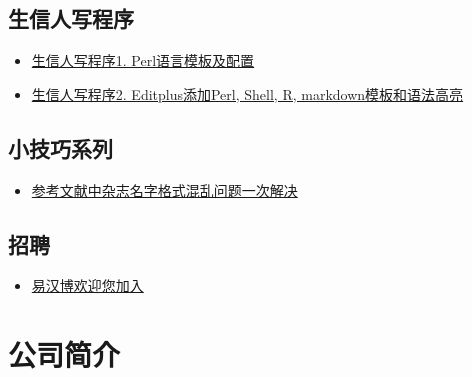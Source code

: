 \documentclass[]{article}
\providecommand{\tightlist}{%
  \setlength{\itemsep}{0pt}\setlength{\parskip}{0pt}}
\numberwithin{figure}{section}
\numberwithin{table}{section}
\theoremstyle{definition}
\theoremstyle{definition}
\theoremstyle{definition}
\theoremstyle{remark}
\begin{document}
\subsection{生信人写程序}

\begin{itemize}
\tightlist
\item
  \href{http://mp.weixin.qq.com/s?__biz=MzI5MTcwNjA4NQ==\&mid=2247483837\&idx=1\&sn=660358a38b7fa6d3de2c95280f7a4535\&chksm=ec0dc437db7a4d21368b312ac43ceae552e1544570639c949e96bf488113a55f67fa2306008e\#rd}{生信人写程序1.
  Perl语言模板及配置}
\item
  \href{http://mp.weixin.qq.com/s?__biz=MzI5MTcwNjA4NQ==\&mid=2247483910\&idx=1\&sn=7813eaa4841d90b0bfc3982bb901de81\&chksm=ec0dc78cdb7a4e9a866f3e0cade3096a13366cac18c873820434f066fdba9bd22a7b5b3d210d\#rd}{生信人写程序2.
  Editplus添加Perl, Shell, R, markdown模板和语法高亮}
\end{itemize}

\subsection{小技巧系列}

\begin{itemize}
\tightlist
\item
  \href{http://mp.weixin.qq.com/s/Diwevx-TVe0Vq_rdgzIkrw}{参考文献中杂志名字格式混乱问题一次解决}
\end{itemize}

\subsection{招聘}

\begin{itemize}
\tightlist
\item
  \href{http://mp.weixin.qq.com/s?__biz=MzI5MTcwNjA4NQ==\&mid=2247484036\&idx=5\&sn=bb1007d2c3d60e7a2bcf2d6fc7a9a2bb\&chksm=ec0dc70edb7a4e185bafd0f49440bf1a032915c7e8d8fc2cb37c70a81ce3446a4ae990df89a5\#rd}{易汉博欢迎您加入}
\end{itemize}

\section{公司简介}\label{companyux5fintro}
\end{document}
